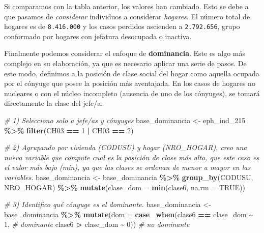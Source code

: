 \documentclass[
]{article}
\newenvironment{Shaded}{\begin{snugshade}}{\end{snugshade}}
\newcommand{\AttributeTok}[1]{\textcolor[rgb]{0.13,0.29,0.53}{#1}}
\newcommand{\CommentTok}[1]{\textcolor[rgb]{0.56,0.35,0.01}{\textit{#1}}}
\newcommand{\ConstantTok}[1]{\textcolor[rgb]{0.56,0.35,0.01}{#1}}
\newcommand{\DecValTok}[1]{\textcolor[rgb]{0.00,0.00,0.81}{#1}}
\newcommand{\FunctionTok}[1]{\textcolor[rgb]{0.13,0.29,0.53}{\textbf{#1}}}
\newcommand{\NormalTok}[1]{#1}
\newcommand{\OtherTok}[1]{\textcolor[rgb]{0.56,0.35,0.01}{#1}}
\newcommand{\SpecialCharTok}[1]{\textcolor[rgb]{0.81,0.36,0.00}{\textbf{#1}}}
\begin{document}
Si comparamos con la tabla anterior, los valores han cambiado. Esto se debe a que pasamos de \emph{considerar} individuos a considerar \emph{hogares}. El número total de hogares es de \texttt{8.416.000} y los casos perdidos ascienden a \texttt{2.792.656}, grupo conformado por hogares con jefatura desocupada o inactiva.

Finalmente podemos considerar el enfoque de \textbf{dominancia}. Este es algo más complejo en su elaboración, ya que es necesario aplicar una serie de pasos. De este modo, definimos a la posición de clase social del hogar como aquella ocupada por el cónyuge que posee la posición más aventajada. En los casos de hogares no nucleares o con el núcleo incompleto (ausencia de uno de los cónyuges), se tomará directamente la clase del jefe/a.

\begin{Shaded}
\begin{Highlighting}[]
\CommentTok{\# 1) Selecciono solo a jefe/as y cónyuges}
\NormalTok{base\_dominancia }\OtherTok{\textless{}{-}}\NormalTok{ eph\_ind\_215 }\SpecialCharTok{\%\textgreater{}\%} 
  \FunctionTok{filter}\NormalTok{(CH03 }\SpecialCharTok{==} \DecValTok{1} \SpecialCharTok{|}\NormalTok{ CH03 }\SpecialCharTok{==} \DecValTok{2}\NormalTok{)}

\CommentTok{\# 2) Agrupando por vivienda (CODUSU) y hogar (NRO\_HOGAR), creo una nueva variable que compute cual es la posición de clase más alta, que este caso es el valor más bajo (min), ya que las clases se ordenan de menor a mayor en las variables.}
\NormalTok{base\_dominancia }\OtherTok{\textless{}{-}}\NormalTok{ base\_dominancia }\SpecialCharTok{\%\textgreater{}\%} 
  \FunctionTok{group\_by}\NormalTok{(CODUSU, NRO\_HOGAR) }\SpecialCharTok{\%\textgreater{}\%} 
  \FunctionTok{mutate}\NormalTok{(}\AttributeTok{clase\_dom =} \FunctionTok{min}\NormalTok{(clase6, }\AttributeTok{na.rm =} \ConstantTok{TRUE}\NormalTok{)) }

\CommentTok{\# 3) Identifico qué cónyuge es el dominante. }
\NormalTok{base\_dominancia }\OtherTok{\textless{}{-}}\NormalTok{ base\_dominancia }\SpecialCharTok{\%\textgreater{}\%} 
  \FunctionTok{mutate}\NormalTok{(}\AttributeTok{dom =} \FunctionTok{case\_when}\NormalTok{(clase6 }\SpecialCharTok{==}\NormalTok{ clase\_dom }\SpecialCharTok{\textasciitilde{}} \DecValTok{1}\NormalTok{, }\CommentTok{\# dominante}
\NormalTok{                         clase6 }\SpecialCharTok{\textgreater{}}\NormalTok{ clase\_dom }\SpecialCharTok{\textasciitilde{}} \DecValTok{0}\NormalTok{)) }\CommentTok{\# no dominante}


\end{Highlighting}
\end{Shaded}
\end{document}
